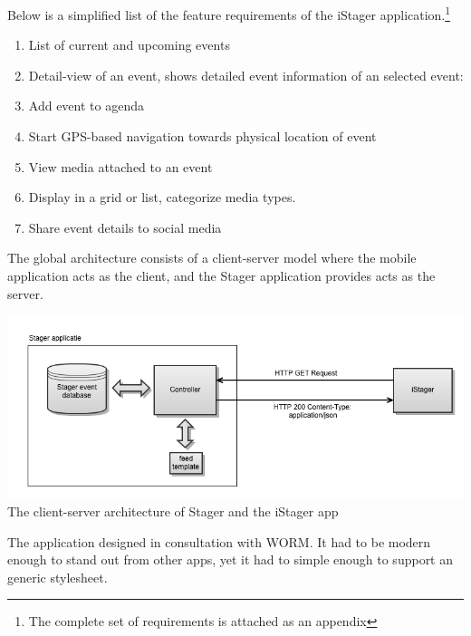 \noindent Below is a simplified list of the feature requirements of the iStager application.\footnote{The complete set of requirements is attached as an appendix} %
\begin{enumerate}
\item
List of current and upcoming events
\item
Detail-view of an event, shows detailed event information of an selected event:
\item
Add event to agenda
\item
Start GPS-based navigation towards physical location of event
\item
View media attached to an event
\item
Display in a grid or list, categorize media types.
\item
Share event details to social media
\end{enumerate}

The global architecture consists of a client-server model where the mobile application acts as the client, and the Stager application provides acts as the server.

\begin{centering}
	\includegraphics[scale=0.4]{images/globale_architectuur.png}\\{The client-server architecture of Stager and the iStager app}\\
\end{centering}

The application designed in consultation with WORM. It had to be modern enough to stand out from other apps, yet it had to simple enough to support an generic stylesheet.


